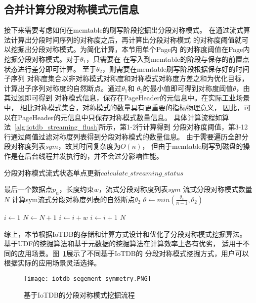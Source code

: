 \subsection{合并计算分段对称模式元信息}

接下来需要考虑如何在memtable的刷写阶段挖掘出分段对称模式。
在通过流式算法计算出分段时间序列的对称度之后，再计算出分段对称模式
的对称度阈值就可以挖掘出分段对称模式。为简化计算，本节用单个Page内
的对称度阈值在Page内挖掘分段对称模式。对于$\theta_1$，只需要在
在写入到memtable的阶段与保存的前置点状态进行差分即可计算。
至于$\theta_2$，则需要在memtable刷写阶段根据保存好的时间子序列
对称度集合以非对称模式对称度和对称模式对称度方差之和为优化目标，
计算出子序列对称度的自然断点。通过$\theta_1$和
$\theta_2$的最小值即可得到对称度阈值$\theta$，由其过滤即可得到
对称模式信息，保存在PageHeader的元信息中。在实际工业场景中，
相比对称模式集合，对称模式的数量具有更重要的指标物理意义，
因此，可以在PageHeader的元信息中只保存对称模式数量信息。
具体计算流程如算法~\ref{alg:iotdb_streaming_flush}所示，第1-2行计算得到
分段对称度阈值，第3-12行通过阈值过滤对称度列表得到分段对称模式的数量信息。
由于需要遍历全部分段对称度列表$sym$，故其时间复杂度为$O(n)$，
但由于memtable刷写到磁盘的操作是在后台线程并发执行的，并不会过分影响性能。

\renewcommand{\algorithmicrequire}{\textbf{输入：}\unskip}
\renewcommand{\algorithmicensure}{\textbf{输出：}\unskip}

\begin{algorithm}
  \caption{分段对称模式流式状态单点更新$calculate\_streaming\_status$}
  \label{alg:iotdb_streaming_flush}
  \small
  \begin{algorithmic}
    \REQUIRE 最后一个数据点$p_n$，长度约束$w$，流式分段对称度列表$sym$
    \ENSURE 流式分段对称模式数量$N$
    \STATE 计算sym流式分段对称度列表的自然断点$\theta_2$
    \STATE $\theta \leftarrow min(\frac{\theta_1}{n-1},\theta_2)$

    \STATE $i \leftarrow 1$
    \STATE $N \leftarrow N+1$
    \STATE $i \leftarrow i+w$
    \ELSE
    \STATE $i \leftarrow i+1$
    \ENDIF
    \ENDWHILE
    \RETURN $N$
  \end{algorithmic}
\end{algorithm}

综上，本节根据IoTDB的存储和计算方式设计和优化了分段对称模式挖掘算法。
基于UDF的挖掘算法和基于元数据的挖掘算法在计算效率上各有优劣，
适用于不同的应用场景。图~\ref{fig:iotdb_segement}展示了不同基于IoTDB的
分段对称模式挖掘方式，用户可以根据实际的应用场景灵活选择。
\begin{figure}
  \centering
  \texttt{[image: iotdb\_segement\_symmetry.PNG]}
  \caption{基于IoTDB的分段对称模式挖掘流程}
  \label{fig:iotdb_segement}
\end{figure}


